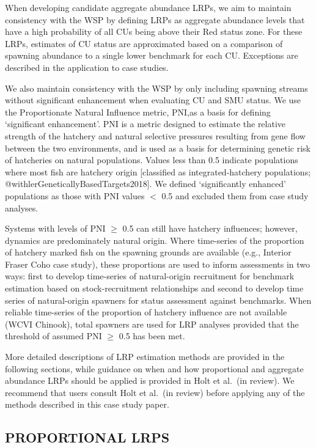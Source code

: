 \documentclass[
]{article}
\begin{document}
When developing candidate aggregate abundance LRPs, we aim to maintain
consistency with the WSP by defining LRPs as aggregate abundance levels
that have a high probability of all CUs being above their Red status
zone. For these LRPs, estimates of CU status are approximated based on a
comparison of spawning abundance to a single lower benchmark for each
CU. Exceptions are described in the application to case studies.

We also maintain consistency with the WSP by only including spawning
streams without significant enhancement when evaluating CU and SMU
status. We use the Proportionate Natural Influence metric, PNI,as a
basis for defining `significant enhancement'. PNI is a metric designed
to estimate the relative strength of the hatchery and natural selective
pressures resulting from gene flow between the two environments, and is
used as a basis for determining genetic risk of hatcheries on natural
populations. Values less than 0.5 indicate populations where most fish
are hatchery origin {[}classified as integrated-hatchery populations;
@withlerGeneticallyBasedTargets2018{]}. We defined `significantly
enhanced' populations as those with PNI values \(<\) 0.5 and excluded
them from case study analyses.

Systems with levels of PNI \(\geqslant\) 0.5 can still have hatchery
influences; however, dynamics are predominately natural origin. Where
time-series of the proportion of hatchery marked fish on the spawning
grounds are available (e.g., Interior Fraser Coho case study), these
proportions are used to inform assessments in two ways: first to develop
time-series of natural-origin recruitment for benchmark estimation based
on stock-recruitment relationships and second to develop time series of
natural-origin spawners for status assessment against benchmarks. When
reliable time-series of the proportion of hatchery influence are not
available (WCVI Chinook), total spawners are used for LRP analyses
provided that the threshold of assumed PNI \(\geqslant\) 0.5 has been
met.

More detailed descriptions of LRP estimation methods are provided in the
following sections, while guidance on when and how proportional and
aggregate abundance LRPs should be applied is provided in Holt et
al.~(in review). We recommend that users consult Holt et al.~(in review)
before applying any of the methods described in this case study paper.

\hypertarget{proportional-lrps}{%
\subsection{PROPORTIONAL LRPS}\label{proportional-lrps}}
\end{document}
